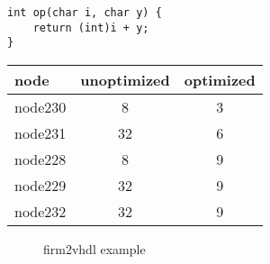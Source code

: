 \newsavebox{\ccode}
\begin{lrbox}{\ccode}%
\begin{lstlisting}
int op(char i, char y) {
	return (int)i + y;
}
\end{lstlisting}
\end{lrbox}

\newsavebox{\opt}
\begin{lrbox}{\opt}%
	\begin{tabular}{ l c c }
		node & unoptimized & optimized \\ 
		\hline
		node230 & 8 & 3  \\
		node231 & 32 & 6  \\
		node228 & 8 & 9 \\
		node229 & 32 & 9 \\
		node232 & 32 & 9 \\
	\end{tabular}
\end{lrbox}


\begin{figure}
	\centering
	\hfill
	\hfill
	\hfill
\label{fig:vrp_loop_examples}
\caption{firm2vhdl example}
\end{figure}
